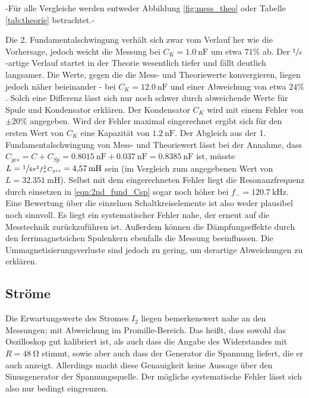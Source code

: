 -Für alle Vergleiche werden entweder Abbildung \ref{fig:mess_theo} oder Tabelle \ref{tab:theorie} betrachtet.-

Die 2. Fundamentalschwingung verhält sich zwar vom Verlauf her wie die Vorhersage, jedoch weicht die Messung bei $C_K = \SI{1.0}{\nano\farad}$ um etwa $71\%$ ab.
Der $\sfrac{1}{x}$-artige Verlauf startet in der Theorie wesentlich tiefer und fällt deutlich langsamer. Die Werte, gegen die die Mess- und Theoriewerte konvergieren, liegen jedoch näher beieinander - bei $C_K = \SI{12.0}{\nano\farad}$
und einer Abweichung von etwa $24\%$.
Solch eine Differenz lässt sich nur noch schwer durch abweichende Werte für Spule und Kondensator erklären. Der Kondensator $C_K$ wird mit einem Fehler von $\pm20\%$ angegeben.
Wird der Fehler maximal eingerechnet ergibt sich für den ersten Wert von $C_K$ eine Kapazität von $\SI{1.2}{\nano\farad}$. 
Der Abgleich aus der 1. Fundamentalschwingung von Mess- und Theoriewert lässt bei der Annahme, dass $C_{ges} = C + C_{Sp} = \SI{0.8015}{\nano\farad} + \SI{0.037}{\nano\farad} = \SI{0.8385}{\nano\farad}$ ist, müsste
$L = \sfrac{1}{4\pi^2f_+^2C_{ges}} = \SI{4.57}{\milli\henry}$ sein (im Vergleich zum angegebenen Wert von $L = \SI{32.351}{\milli\henry}$).
Selbst mit dem eingerechneten Fehler liegt die Resonanzfrequenz durch einsetzen in \eqref{eqn:2nd_fund_Csp} sogar noch höher bei $f_- = \SI{120.7}{\kilo\hertz}$.
Eine Bewertung über die einzelnen Schaltkreiselemente ist also weder plausibel noch sinnvoll. Es liegt ein systematischer Fehler nahe, der erneut auf die Messtechnik zurückzuführen ist.
Außerdem können die Dämpfungseffekte durch den ferrimagnetsichen Spulenkern ebenfalls die Messung beeinflussen. Die Ummagnetisierungsverluste sind jedoch zu gering, um derartige Abweichungen zu erklären.

\subsection{Ströme}
Die Erwartungswerte des Stromes $I_2$ liegen bemerkenswert nahe an den Messungen; mit Abweichung im Promille-Bereich. %
Das heißt, dass sowohl das Oszilloskop gut kalibriert ist, als auch dass die Angabe des Widerstandes mit $R = \SI{48}{\ohm}$ stimmt, sowie aber auch dass der Generator die Spannung liefert, die er auch anzeigt.
Allerdings macht diese Genauigkeit keine Aussage über den Sinusgenerator der Spannungsquelle. Der mögliche systematische Fehler lässt sich also nur bedingt eingrenzen.

